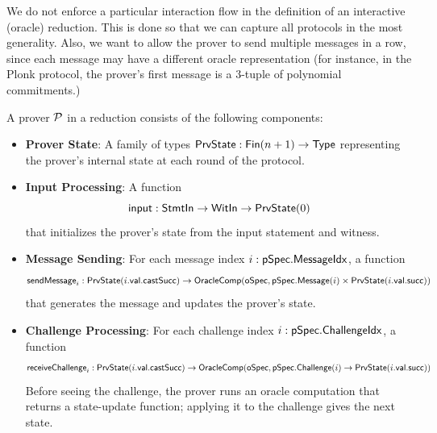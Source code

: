 \begin{remark}
    We do not enforce a particular interaction flow in the definition of an interactive (oracle) reduction. This is done so that we can capture all protocols in the most generality. Also, we want to allow the prover to send multiple messages in a row, since each message may have a different oracle representation (for instance, in the Plonk protocol, the prover's first message is a 3-tuple of polynomial commitments.)
\end{remark}

\begin{definition}
    \label{def:prover}
    A prover \(\mathcal{P}\) in a reduction consists of the following components:

    \begin{itemize}
        \item \textbf{Prover State}: A family of types \(\mathsf{PrvState} : \mathsf{Fin}(n+1) \to \mathsf{Type}\) representing the prover's internal state at each round of the protocol.

        \item \textbf{Input Processing}: A function
        \begin{equation*} \mathsf{input} : \mathsf{StmtIn} \to \mathsf{WitIn} \to \mathsf{PrvState}(0) \end{equation*}
        that initializes the prover's state from the input statement and witness.

        \item \textbf{Message Sending}: For each message index \(i : \mathsf{pSpec}.\mathsf{MessageIdx}\), a function
        \begin{equation*} \mathsf{sendMessage}_i : \mathsf{PrvState}(i.\mathsf{val}.\mathsf{castSucc}) \to \mathsf{OracleComp}(\mathsf{oSpec}, \mathsf{pSpec}.\mathsf{Message}(i) \times \mathsf{PrvState}(i.\mathsf{val}.\mathsf{succ})) \end{equation*}
        that generates the message and updates the prover's state.

        \item \textbf{Challenge Processing}: For each challenge index \(i : \mathsf{pSpec}.\mathsf{ChallengeIdx}\), a function
        \begin{equation*} \mathsf{receiveChallenge}_i : \mathsf{PrvState}(i.\mathsf{val}.\mathsf{castSucc}) \to \mathsf{OracleComp}(\mathsf{oSpec}, \mathsf{pSpec}.\mathsf{Challenge}(i) \to \mathsf{PrvState}(i.\mathsf{val}.\mathsf{succ})) \end{equation*}
        Before seeing the challenge, the prover runs an oracle computation that returns a
        state-update function; applying it to the challenge gives the next state.


\end{itemize}
\end{definition}
